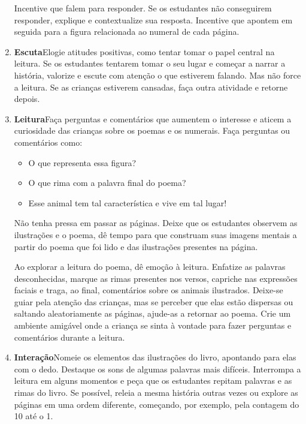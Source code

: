 \documentclass[11pt]{extarticle}
\begin{document}
\begin{enumerate}
Incentive que falem para responder. Se os estudantes não 
conseguirem responder, explique e contextualize sua
resposta. Incentive que apontem em seguida para a figura relacionada ao numeral de cada página. 

\item \textbf{Escuta}\quad Elogie atitudes positivas, como 
tentar tomar o papel central na leitura. Se os estudantes tentarem 
tomar o seu lugar e começar a narrar a história, valorize e escute com atenção o que estiverem falando. Mas não 
force a leitura. Se as crianças estiverem cansadas, faça outra atividade 
e retorne depois. 

\item \textbf{Leitura}\quad Faça perguntas e comentários que aumentem o 
interesse e aticem a curiosidade das crianças sobre os poemas e os numerais. Faça 
perguntas ou comentários como: 

\begin{itemize}
\item O que representa essa figura?
\item O que rima com a palavra final do poema?
\item Esse animal tem tal característica e vive em tal lugar!
\end{itemize}

Não tenha pressa em passar as páginas. Deixe que os estudantes 
observem as ilustrações e o poema, dê tempo para que construam suas imagens 
mentais a partir do poema que foi lido e das ilustrações presentes na página. 

Ao explorar a leitura do poema, dê emoção 
à leitura. Enfatize as palavras desconhecidas, marque as rimas presentes nos versos,
capriche nas expressões faciais e traga, ao final, comentários sobre os animais ilustrados.
Deixe-se guiar pela atenção das crianças, mas se perceber que 
elas estão dispersas ou saltando aleatoriamente as páginas, ajude-as 
a retornar ao poema. Crie um ambiente amigável onde a criança 
se sinta à vontade para fazer perguntas e comentários durante a leitura.

\item \textbf{Interação}\quad Nomeie os elementos das ilustrações 
do livro, apontando para elas com o dedo. Destaque os sons de algumas 
palavras mais difíceis. Interrompa a leitura em alguns momentos e peça que 
os estudantes repitam palavras e as rimas do livro. Se possível, 
releia a mesma história outras vezes ou explore as páginas em uma ordem 
diferente, começando, por exemplo, pela contagem do 10 até o 1. 
\end{enumerate}
\end{document}
